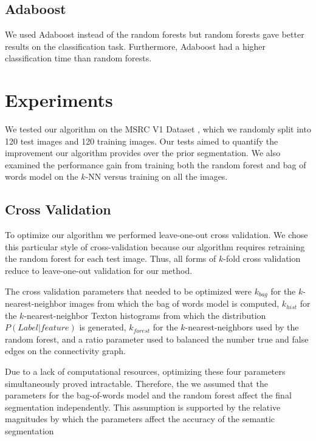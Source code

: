 \documentclass{article} %
\begin{document}
\subsection{Adaboost}
We used Adaboost \cite{Freund96experimentswith} instead of the random forests but random forests gave better results on the classification task. Furthermore, Adaboost had a higher classification time than random forests.



\section{Experiments}
\label{sec:Exp}

We tested our algorithm on the MSRC V1 Dataset \cite{MSRC}, which we randomly split into 120 test images and 120 training images.
Our tests aimed to quantify the improvement our algorithm provides over the prior segmentation. We also examined the performance gain from training both the random forest and bag of words model on the $k$-NN versus training on all the images.

\subsection{Cross Validation}
\label{sec:cross}

To optimize our algorithm we performed leave-one-out cross validation. We chose this particular style of cross-validation because our algorithm requires retraining the random forest for each test image. Thus, all forms of $k$-fold cross validation reduce to leave-one-out validation for our method.

The cross validation parameters that needed to be optimized were $k_{bag}$ for the $k$-nearest-neighbor images from which the bag of words model is computed, $k_{hist}$ for the $k$-nearest-neighbor Texton histograms from which the distribution $P(Label | feature)$ is generated, $k_{forest}$ for the $k$-nearest-neighbors used by the random forest, and a ratio parameter used to balanced the number true and false edges on the connectivity graph. 

Due to a lack of computational resources, optimizing these four parameters simultaneously proved intractable. Therefore, the we assumed that the parameters for the bag-of-words model and the random forest affect the final segmentation independently. This assumption is supported by the relative magnitudes by which the parameters affect the accuracy of the semantic segmentation
\end{document}
